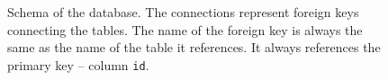     
    
    

\begin{figure}
    \centering
    \footnotesize
    \def\svgwidth{\columnwidth}
    
    \caption[Schema of the database]{Schema of the database. The connections represent foreign keys connecting the tables. The name of the foreign key is always the same as the name of the table it references. It always references the primary key -- column \texttt{id}.}
    \label{fig:database_schema}
\end{figure}


